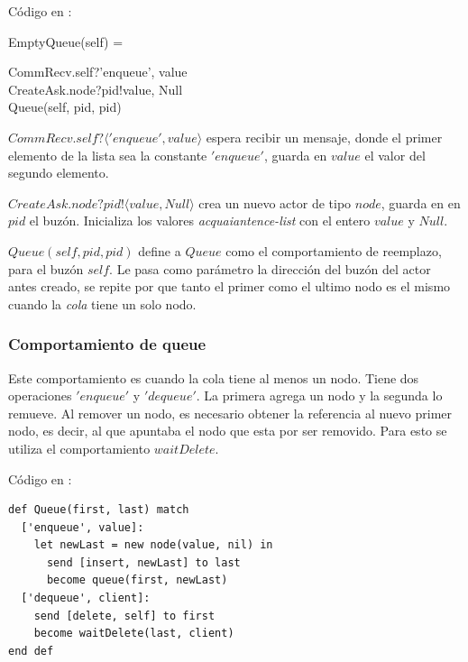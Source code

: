 Código en \CSP:

\begin{process}
EmptyQueue(self) = \\ \quad
  \begin{block}
  CommRecv.self?\langle 'enqueue', value \rangle \then \\ 
  CreateAsk.node?pid!\langle value, Null\rangle \then \\
  Queue(self, pid, pid)
  \end{block}
\end{process}

\begin{description}
 \item $CommRecv.self?\langle 'enqueue', value \rangle$ espera recibir un mensaje, donde el primer elemento de la lista sea la constante $'enqueue'$, guarda en $value$ el valor del segundo elemento.
 \item $CreateAsk.node?pid!\langle value, Null \rangle$ crea un nuevo actor de tipo $node$, guarda en en $pid$ el buzón. Inicializa los valores \textit{acquaiantence-list} con el entero $value$ y $Null$.
 \item $Queue(self, pid, pid)$ define a $Queue$ como el comportamiento de reemplazo, para el buzón $self$. Le pasa como parámetro la dirección del buzón del actor antes creado, se repite por que tanto el primer como el ultimo nodo es el mismo cuando la \textit{cola} tiene un solo nodo.
\end{description}

\subsubsection*{Comportamiento de queue}
Este comportamiento es cuando la cola tiene al menos un nodo. Tiene dos operaciones $'enqueue'$ y $'dequeue'$. La primera agrega un nodo y la segunda lo remueve. Al remover un nodo, es necesario obtener la referencia al nuevo primer nodo, es decir, al que apuntaba el nodo que esta por ser removido. Para esto se utiliza el comportamiento $waitDelete$.

Código en \SAL:

\begin{lstlisting}[language=sal, style=simple]
def Queue(first, last) match 
  ['enqueue', value]: 
    let newLast = new node(value, nil) in
      send [insert, newLast] to last
      become queue(first, newLast)
  ['dequeue', client]: 
    send [delete, self] to first
    become waitDelete(last, client)
end def
\end{lstlisting}

